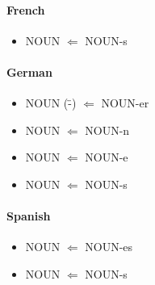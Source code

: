 \documentclass[a4paper,11pt]{article}
\begin{document}
	\paragraph{French}
	\begin{itemize}
		\itemsep-0.2em 
		\item NOUN $\Leftarrow$ NOUN-s
	\end{itemize}
	
	\paragraph{German}
	\begin{itemize}
		\itemsep-0.2em 
		\item NOUN (\"-) $\Leftarrow$ NOUN-er
		\item NOUN $\Leftarrow$ NOUN-n
		\item NOUN $\Leftarrow$ NOUN-e
		\item NOUN $\Leftarrow$ NOUN-s
	\end{itemize}
	
	\paragraph{Spanish}
	\begin{itemize}
		\itemsep-0.2em 
		\item NOUN $\Leftarrow$ NOUN-es
		\item NOUN $\Leftarrow$ NOUN-s
	\end{itemize}
	
	
	
\end{document}
